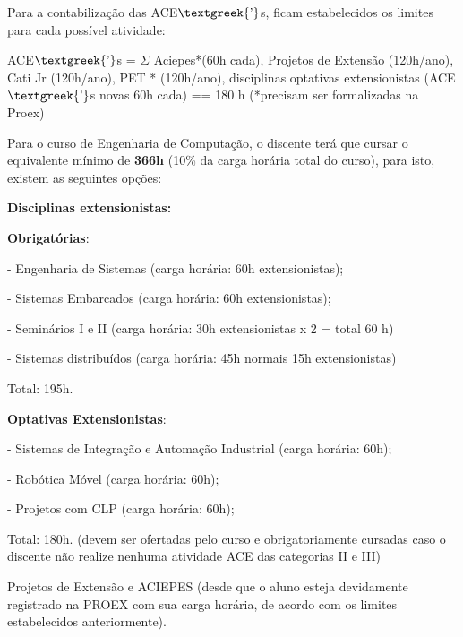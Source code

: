 Para a contabilização das ACE$\text{\textgreek{’}}$s, ficam estabelecidos os limites para cada possível atividade:

ACE$\text{\textgreek{’}}$s = $\Sigma $ Aciepes*(60h cada), Projetos de Extensão (120h/ano), Cati Jr (120h/ano), PET%
* (120h/ano), disciplinas optativas extensionistas (ACE$\text{\textgreek{’}}$s novas 60h cada) == 180 h  (*precisam ser formalizadas na Proex)


\bigskip

Para o curso de Engenharia de Computação, o discente terá que cursar o equivalente mínimo de \textbf{366h} (10\% da
carga horária total do curso), para isto, existem as seguintes opções: 


\bigskip

\textbf{Disciplinas extensionistas: }

\textbf{Obrigatórias}:

{}- Engenharia de Sistemas (carga horária: 60h extensionistas);

{}- Sistemas Embarcados (carga horária: 60h extensionistas);

{}- Seminários I e II (carga horária: 30h extensionistas x 2 = total 60 h)

{}- Sistemas distribuídos (carga horária: 45h normais 15h extensionistas)

Total: 195h.


\bigskip

\textbf{Optativas Extensionistas}:

{}- Sistemas de Integração e Automação Industrial (carga horária: 60h);

{}- Robótica Móvel (carga horária: 60h);

{}- Projetos com CLP (carga horária: 60h);


Total: 180h. (devem ser ofertadas pelo curso e obrigatoriamente cursadas caso o discente não realize nenhuma atividade
ACE das categorias II e III)


\bigskip





Projetos de Extensão e ACIEPES (desde que o aluno esteja devidamente registrado na PROEX com sua carga horária, de
acordo com os limites estabelecidos anteriormente).


